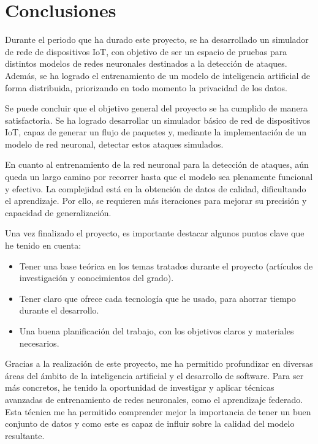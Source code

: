 
\section{Conclusiones}
\label{sec:Conclusiones}
Durante el periodo que ha durado este proyecto, se ha desarrollado un simulador de rede de dispositivos IoT, con objetivo de ser un espacio de pruebas para distintos modelos de redes neuronales destinados a la detección de ataques. Además, se ha logrado el entrenamiento de un modelo de inteligencia artificial de forma distribuida, priorizando en todo momento la privacidad de los datos.

Se puede concluir que el objetivo general del proyecto se ha cumplido de manera satisfactoria. Se ha logrado desarrollar un simulador básico de red de dispositivos IoT, capaz de generar un flujo de paquetes y, mediante la implementación de un modelo de red neuronal, detectar estos ataques simulados. 

En cuanto al entrenamiento de la red neuronal para la detección de ataques, aún queda un largo camino por recorrer hasta que el modelo sea plenamente funcional y efectivo. La complejidad está en la obtención de datos de calidad, dificultando el aprendizaje. Por ello, se requieren más iteraciones para mejorar su precisión y capacidad de generalización.

Una vez finalizado el proyecto, es importante destacar algunos puntos clave que he tenido en cuenta:
\begin{itemize}
    \item Tener una base teórica en los temas tratados durante el proyecto (artículos de investigación y conocimientos del grado).
    \item Tener claro que ofrece cada tecnología que he usado, para ahorrar tiempo durante el desarrollo.
    \item Una buena planificación del trabajo, con los objetivos claros y materiales necesarios.
\end{itemize}

Gracias a la realización de este proyecto, me ha permitido profundizar en diversas áreas del ámbito de la inteligencia artificial y el desarrollo de software. Para ser más concretos, he tenido la oportunidad de investigar y aplicar técnicas avanzadas de entrenamiento de redes neuronales, como el aprendizaje federado. Esta técnica me ha permitido comprender mejor la importancia de tener un buen conjunto de datos y como este es capaz de influir sobre la calidad del modelo resultante.

